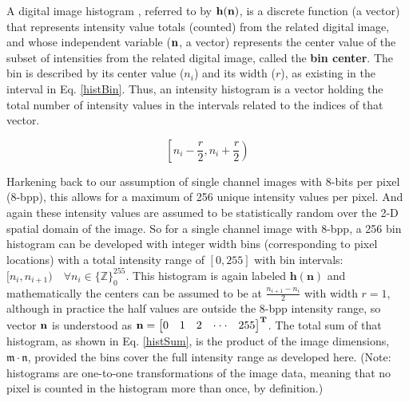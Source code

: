%
%
%
%
%
%
%
%
%

%
%
%



A digital image histogram \cite{Gonzalez2008}, referred to by $\bf{h}(\bf{n})$, is a discrete function (a vector) that represents intensity value totals (counted) from the related digital image, and whose independent variable ($\bf{n}$, a vector) represents the center value of the subset of intensities from the related digital image, called the \textbf{bin center}. The bin is described by its center value ($n_{i}$) and its width ($r$), as existing in the interval in Eq. \ref{histBin}. Thus, an intensity histogram is a vector holding the total number of intensity values in the intervals related to the indices of that vector. 

\begin{equation}
\label{histBin}
\left[n_{i}-\frac{r}{2},n_{i}+\frac{r}{2}\right)
\end{equation}

Harkening back to our assumption of single channel images with 8-bits per pixel (8-bpp), this allows for a maximum of 256 unique intensity values per pixel. And again these intensity values are assumed to be statistically random over the 2-D spatial domain of the image. So for a single channel image with 8-bpp, a 256 bin histogram can be developed with integer width bins (corresponding to pixel locations) with a total intensity range of $[0,255]$ with bin intervals: $[n_{i},n_{i+1}) \quad \forall n_{i} \in \{\mathbb{Z}\}_{0}^{255}$. This histogram is again labeled $\textbf{h}(\textbf{n})$ and mathematically the centers can be assumed to be at $\frac{n_{i+1}-n_{i}}{2}$ with width $r=1$, although in practice the half values are outside the 8-bpp intensity range, so vector $\bf{n}$ is understood as $\bf{n}=\begin{bmatrix}0&1&2&\cdot\cdot\cdot&255\end{bmatrix}^{T}$. The total sum of that histogram, as shown in Eq. \ref{histSum}, is the product of the image dimensions, $\mathfrak{m} \cdot \mathfrak{n}$, provided the bins cover the full intensity range as developed here. (Note: histograms are one-to-one transformations of the image data, meaning that no pixel is counted in the histogram more than once, by definition.)


